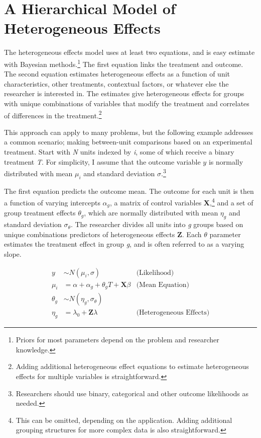 \documentclass[12pt]{article}
\begin{document}
\section{A Hierarchical Model of Heterogeneous Effects}


The heterogeneous effects model uses at least two equations, and is easy estimate with Bayesian methods.\footnote{Priors for most parameters depend on the problem and researcher knowledge.} 
The first equation links the treatment and outcome. 
The second equation estimates heterogeneous effects as a function of unit characteristics, other treatments, contextual factors, or whatever else the researcher is interested in. 
The estimates give heterogeneous effects for groups with unique combinations of variables that modify the treatment and correlates of differences in the treatment.\footnote{Adding additional heterogeneous effect equations to estimate heterogeneous effects for multiple variables is straightforward.}  


This approach can apply to many problems, but the following example addresses a common scenario; making between-unit comparisons based on an experimental treatment.    
Start with \textit{N} units indexed by \textit{i}, some of which receive a binary treatment \textit{T}.
For simplicity, I assume that the outcome variable ${y}$ is normally distributed with mean $\mu_i$ and standard deviation $\sigma$.\footnote{Researchers should use binary, categorical and other outcome likelihoods as needed.}


The first equation predicts the outcome mean. 
The outcome for each unit is then a function of varying intercepts $\alpha_g$, a matrix of control variables \textbf{X},\footnote{This can be omitted, depending on the application. Adding additional grouping structures for more complex data is also straightforward.} and a set of group treatment effects $\theta_g$, which are normally distributed with mean $\eta_g$ and standard deviation $\sigma_\theta$. 
The researcher divides all units into \textit{g} groups based on unique combinations predictors of heterogeneous effects \textbf{Z}. 
Each $\theta$ parameter estimates the treatment effect in group \textit{g}, and is often referred to as a varying slope. 


\begin{equation}
\begin{aligned}
y &\sim N(\mu_i, \sigma) &\text{(Likelihood)} \\
\mu_i &= \alpha + \alpha_g + \theta_g \textit{T} + \textbf{X} \beta &\text{(Mean Equation)}  \\
\theta_g &\sim N(\eta_g, \sigma_\theta) \\ 
\eta_g &= \lambda_0 + \textbf{Z} \lambda &\text{(Heterogeneous Effects)} 
\end{aligned}
\end{equation}
\end{document}
